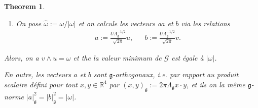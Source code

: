 \documentclass[12pt,a4paper]{article}
\theoremstyle{plain}
\newtheorem{theorem}{Theorem}[section]
\theoremstyle{plain}
\theoremstyle{plain}
\theoremstyle{definition}
\theoremstyle{definition}
\theoremstyle{definition}
\theoremstyle{plain}
\newcommand{\N}{\mathbb{N}}
\newcommand{\R}{\mathbb{R}}
\begin{document}
\begin{itemize}
\begin{theorem}
\begin{enumerate}
\item On pose $\hat{\omega} := \omega/|\omega|$ et on calcule les vecteurs a$a$ et $b$ via les relations
\begin{equation}
\label{eq:global minimizer form}
\begin{aligned}
a := \frac{U \Lambda_{\mathfrak{g}}^{-1/2}}{\sqrt{2 \pi}} u,&& b := \frac{U \Lambda_{\mathfrak{g}}^{-1/2}}{\sqrt{2 \pi}} v.
\end{aligned}
\end{equation}
\end{enumerate}
Alors, on a $ v \wedge u = \omega$ et the la valeur minimum de $\mathcal{G}$ est égale à $|\omega|$.

En outre, les vecteurs $a$ et $b$ sont $\mathfrak{g}$-orthogonaux, i.e. par rapport au produit scalaire défini pour tout $x,y \in \R^4$ par $(x, y)_{\mathfrak{g}} := 2 \pi \Lambda_{\mathfrak{g}} x \cdot y$, et ils on la même $\mathfrak{g}$-norme $|a|_{\mathfrak{g}}^2 = |b|_{\mathfrak{g}}^2 = |\omega|$. 
\end{theorem}

%
\end{itemize}
\end{document}
